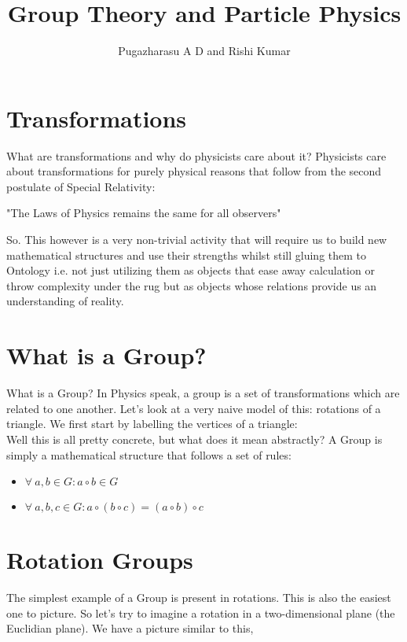 \documentclass[]{article}
\title{Group Theory and Particle Physics}
\author{Pugazharasu A D and Rishi Kumar}
\begin{document}
\maketitle

\begin{abstract}

\end{abstract}
\section{Transformations}
What are transformations and why do physicists care about it? Physicists care about transformations for purely physical reasons that follow from the second postulate of Special Relativity:\\
\begin{center}
"The Laws of Physics remains the same for all observers"
\end{center}
So. This however is a very non-trivial activity that will require us to build new mathematical structures and use their strengths whilst still gluing them to Ontology i.e. not just utilizing them as objects that ease away calculation or throw complexity under the rug but as objects whose relations provide us an understanding of reality.

\section{What is a Group?}
What is a Group? In Physics speak, a group is a set of transformations which are related to one another. Let's look at a very naive model of this: rotations of a triangle. We first start by labelling the vertices of a triangle:\\

Well this is all pretty concrete, but what does it mean abstractly? A Group is simply a mathematical structure that follows a set of rules:
\begin{itemize}
\item $\forall \ a,b \in G: a \circ b \in G$
\item $\forall \ a,b,c \in G: a \circ (b \circ c) = (a \circ b) \circ c$	
\end{itemize}
\section{Rotation Groups}
The simplest example of a Group is present in rotations. This is also the easiest one to picture. So let's try to imagine a rotation in a two-dimensional plane (the Euclidian plane). We have a picture similar to this,
\end{document}
